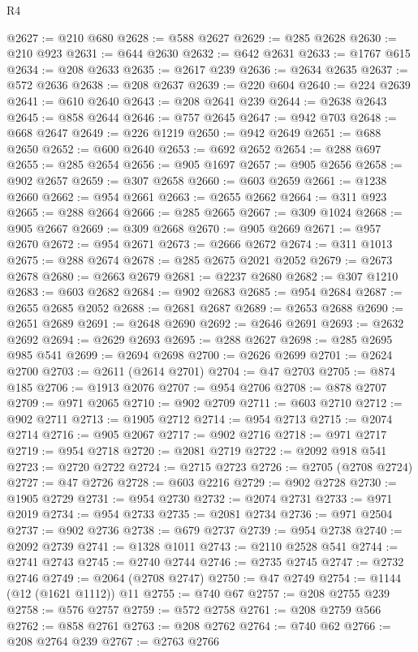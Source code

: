 \begin{lexlean}{R4}
\begin{coremodule}
@2627 := @210 @680
@2628 := @588 @2627
@2629 := @285 @2628
@2630 := @210 @923
@2631 := @644 @2630
@2632 := @642 @2631
@2633 := @1767 @615
@2634 := @208 @2633
@2635 := @2617 @239
@2636 := @2634 @2635
@2637 := @572 @2636
@2638 := @208 @2637
@2639 := @220 @604
@2640 := @224 @2639
@2641 := @610 @2640
@2643 := @208 @2641 @239
@2644 := @2638 @2643
@2645 := @858 @2644
@2646 := @757 @2645
@2647 := @942 @703
@2648 := @668 @2647
@2649 := @226 @1219
@2650 := @942 @2649
@2651 := @688 @2650
@2652 := @600 @2640
@2653 := @692 @2652
@2654 := @288 @697
@2655 := @285 @2654
@2656 := @905 @1697
@2657 := @905 @2656
@2658 := @902 @2657
@2659 := @307 @2658
@2660 := @603 @2659
@2661 := @1238 @2660
@2662 := @954 @2661
@2663 := @2655 @2662
@2664 := @311 @923
@2665 := @288 @2664
@2666 := @285 @2665
@2667 := @309 @1024
@2668 := @905 @2667
@2669 := @309 @2668
@2670 := @905 @2669
@2671 := @957 @2670
@2672 := @954 @2671
@2673 := @2666 @2672
@2674 := @311 @1013
@2675 := @288 @2674
@2678 := @285 @2675 @2021 @2052
@2679 := @2673 @2678
@2680 := @2663 @2679
@2681 := @2237 @2680
@2682 := @307 @1210
@2683 := @603 @2682
@2684 := @902 @2683
@2685 := @954 @2684
@2687 := @2655 @2685 @2052
@2688 := @2681 @2687
@2689 := @2653 @2688
@2690 := @2651 @2689
@2691 := @2648 @2690
@2692 := @2646 @2691
@2693 := @2632 @2692
@2694 := @2629 @2693
@2695 := @288 @2627
@2698 := @285 @2695 @985 @541
@2699 := @2694 @2698
@2700 := @2626 @2699
@2701 := @2624 @2700
@2703 := @2611 (@2614 @2701)
@2704 := @47 @2703
@2705 := @874 @185
@2706 := @1913 @2076
@2707 := @954 @2706
@2708 := @878 @2707
@2709 := @971 @2065
@2710 := @902 @2709
@2711 := @603 @2710
@2712 := @902 @2711
@2713 := @1905 @2712
@2714 := @954 @2713
@2715 := @2074 @2714
@2716 := @905 @2067
@2717 := @902 @2716
@2718 := @971 @2717
@2719 := @954 @2718
@2720 := @2081 @2719
@2722 := @2092 @918 @541
@2723 := @2720 @2722
@2724 := @2715 @2723
@2726 := @2705 (@2708 @2724)
@2727 := @47 @2726
@2728 := @603 @2216
@2729 := @902 @2728
@2730 := @1905 @2729
@2731 := @954 @2730
@2732 := @2074 @2731
@2733 := @971 @2019
@2734 := @954 @2733
@2735 := @2081 @2734
@2736 := @971 @2504
@2737 := @902 @2736
@2738 := @679 @2737
@2739 := @954 @2738
@2740 := @2092 @2739
@2741 := @1328 @1011
@2743 := @2110 @2528 @541
@2744 := @2741 @2743
@2745 := @2740 @2744
@2746 := @2735 @2745
@2747 := @2732 @2746
@2749 := @2064 (@2708 @2747)
@2750 := @47 @2749
@2754 := @1144 (@12 (@1621 @1112)) @11
@2755 := @740 @67
@2757 := @208 @2755 @239
@2758 := @576 @2757
@2759 := @572 @2758
@2761 := @208 @2759 @566
@2762 := @858 @2761
@2763 := @208 @2762
@2764 := @740 @62
@2766 := @208 @2764 @239
@2767 := @2763 @2766

\end{coremodule}
\end{lexlean}
